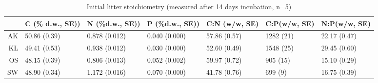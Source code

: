 \begin{table}[ht]
\begin{center}
\begin{tabular}{rllllll}
  \hline
 & C (\% d.w., SE)) & N (\%d.w., SE)) & P (\%d.w., SE)) & C:N (w/w, SE) & C:P(w/w, SE) & N:P(w/w, SE) \\ 
  \hline
AK & 50.86 (0.39) & 0.878 (0.012) & 0.040 (0.000) & 57.86 (0.57) & 1282 (21) & 22.17 (0.47) \\ 
  KL & 49.41 (0.53) & 0.938 (0.012) & 0.030 (0.000) & 52.60 (0.49) & 1548 (25) & 29.45 (0.60) \\ 
  OS & 48.15 (0.39) & 0.806 (0.013) & 0.052 (0.002) & 59.97 (0.72) & 905 (15) & 15.10 (0.29) \\ 
  SW & 48.90 (0.34) & 1.172 (0.016) & 0.070 (0.000) & 41.78 (0.76) & 699 (9) & 16.75 (0.39) \\ 
   \hline
\end{tabular}
\caption{Initial litter stoichiometry (measured after 14 days incubation, n=5)}
\label{initstoech}
\end{center}
\end{table}
